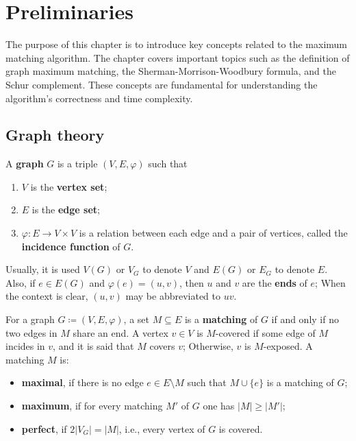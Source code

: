\renewcommand*{\proofname}{Proof}

\chapter{Preliminaries}

The purpose of this chapter is to introduce key concepts related to the maximum matching algorithm. 
The chapter covers important topics such as the definition of graph maximum matching, the Sherman-Morrison-Woodbury formula, and the Schur complement. 
These concepts are fundamental for understanding the algorithm's correctness and time complexity.

\enlargethispage{.5\baselineskip}

\section{Graph theory}
\label{sec:graph}

\begin{definition}[Graph]
	\label{def:graph}
	A \textbf{graph} \(G\) is a triple \((V, E, \varphi)\) such that
	\begin{enumerate}[label=(\roman*)]
		\item \(V\) is the \textbf{vertex set};
		\item \(E\) is the \textbf{edge set};
		\item \(\varphi: E \to V \times V\) is a relation between each edge and a pair of vertices, called the \textbf{incidence function} of \(G\).
	\end{enumerate}
	Usually, it is used 
	\(V(G)\) or \(V_G\) to denote \(V\) and 
	\(E(G)\) or \(E_G\) to denote \(E\).
	Also, if \(e \in E(G)\) and \(\varphi(e) = (u, v)\), then \(u\) and \(v\) are the \textbf{ends} of \(e\);
	When the context is clear, \((u, v)\) may be abbreviated to \(uv\).
\end{definition}

\begin{definition}[Matching]
	\label{def:matching}
	For a graph \(G \coloneqq (V, E, \varphi)\), a set \(M \subseteq E\) is a \textbf{matching} of \(G\) if and only if no two edges in \(M\) share an end.
	A vertex \(v \in V\) is \(M\)-covered if some edge of \(M\) incides in \(v\), 
	and it is said that \(M\) covers \(v\);
	Otherwise, \(v\) is \(M\)-exposed.
	A matching \(M\) is:
	\begin{itemize}
		\item 
			\textbf{maximal}, if there is no edge \(e \in E \setminus M\) such that \(M \cup \{e\}\) is a matching of \(G\);

		\item
			\textbf{maximum}, if for every matching \(M'\) of \(G\) one has \(|M| \geq |M'|\);
	
		\item
			\textbf{perfect}, if \(2|V_G| = |M|\), i.e., every vertex of \(G\) is covered.
	\end{itemize}
\end{definition}

